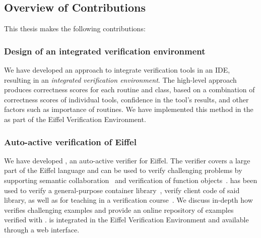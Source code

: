 \subsection{Overview of Contributions}

This thesis makes the following contributions:

\subsubsection{Design of an integrated verification environment~\cite{TSCHANNEN11}}

We have developed an approach to integrate verification tools in an IDE, resulting in an \emph{integrated verification environment}.
The high-level approach produces correctness scores for each routine and class, based on a combination of correctness scores of individual tools, confidence in the tool's results, and other factors such as importance of routines.
We have implemented this method in the \VAssist as part of the Eiffel Verification Environment.


\subsubsection{Auto-active verification of Eiffel~\cite{TSCHANNEN15,TSCHANNEN14}}

We have developed \AutoProof, an auto-active verifier for Eiffel.
The verifier covers a large part of the Eiffel language and can be used to verify challenging problems by supporting semantic collaboration~\cite{POLIKARPOVA14} and verification of function objects~\cite{NORDIO10}.
\AutoProof has been used to verify a general-purpose container library~\cite{POLIKARPOVA15}, verify client code of said library, as well as for teaching in a verification course~\cite{FURIA15}.
We discuss in-depth how \AutoProof verifies challenging examples and provide an online repository of examples verified with \AutoProof.
\AutoProof is integrated in the Eiffel Verification Environment and available through a web interface.


